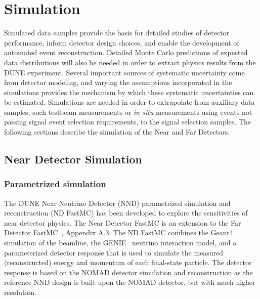 \chapter{Simulation}
\label{annex:detectors-sc-physics-software-simulation}

Simulated data samples provide the basis for detailed studies of detector performance, inform
detector design choices,  and enable the development of automated event reconstruction.
Detailed Monte Carlo predictions of expected data distributions will also be needed
in order to extract physics results from the DUNE experiment.   Several important sources
of systematic uncertainty come from detector modeling, and varying the assumptions incorporated
in the simulations provides the mechanism by which these systematic uncertainties can be estimated.
Simulations are needed in order
to extrapolate from auxiliary data samples, such testbeam measurements or {\it in situ} measurements
using events not passing signal event selection requirements, to the signal selection samples.
The following sections describe the simulation of the Near and Far Detectors.

\section{Near Detector Simulation}
\label{annex:detectors-sc-physics-software-simulation-nd}
\subsection{Parametrized simulation}
The DUNE Near Neutrino Detector (NND) parametrized simulation and reconstruction (ND FastMC) has been
developed to explore the sensitivities of near detector physics. The Near Detector FastMC is an
extension to the Far Detector FastMC~\cite{Adams:2013qkq}, Appendix A.3. The ND FastMC combines
the Geant4 simulation of the beamline, the GENIE~\cite{GENIE} neutrino interaction model, and a parameterized
detector response that is used to simulate the measured (reconstructed) energy and momentum of each
final-state particle. The detector response is based on the NOMAD detector simulation and reconstruction
as the reference NND design is built upon the NOMAD detector, but with much higher resolution.

